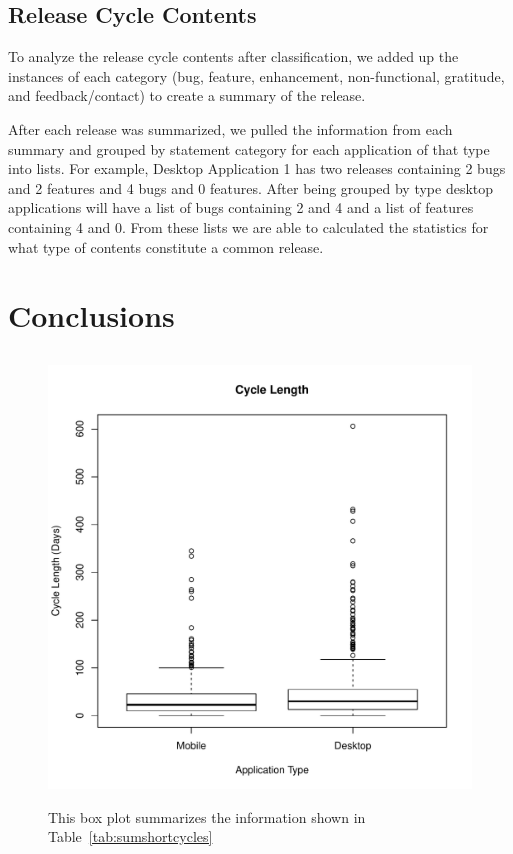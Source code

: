 \documentclass{acm_proc_article-sp}
\begin{document}
\subsection{Release Cycle Contents}

To analyze the release cycle contents after classification, we added up the instances of each category (bug, feature, enhancement, non-functional, gratitude, and feedback/contact) to create a summary of the release.

After each release was summarized, we pulled the information from each summary and grouped by statement category for each application of that type into lists. 
For example, Desktop Application 1 has two releases containing 2 bugs and 2 features and 4 bugs and 0 features. After being grouped by type desktop applications will have a list of bugs containing 2 and 4 and a list of features containing 4 and 0.
From these lists we are able to calculated the statistics for what type of contents constitute a common release.

\section{Conclusions}


\subsection{\RQOne }



\begin{figure}
\includegraphics[width=.5\textwidth]{ShortCycleBoxPlot.pdf}
\label{fig:ShortCycleBox}
\caption{This box plot summarizes the information shown in Table~\ref{tab:sumshortcycles}}
\end{figure}


\label{tab:sumshortcycles}
\end{document}
